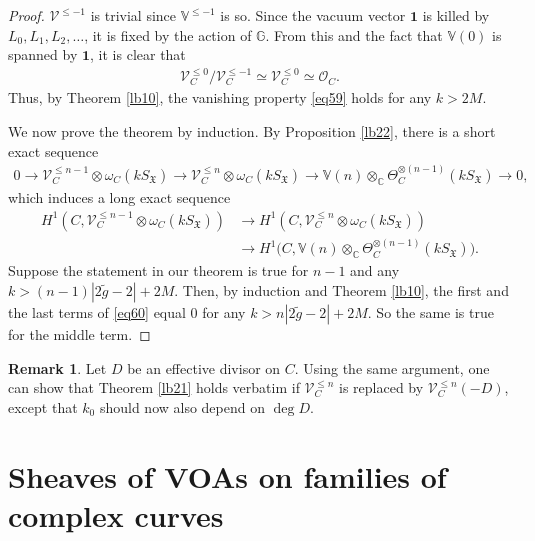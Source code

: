 \documentclass[12pt,a4paper,notitlepage]{report}
\theoremstyle{definition}
\newtheorem{rem}[df]{Remark}
\theoremstyle{plain}
\newcommand{\fk}{\mathfrak}
\newcommand{\wtd}{\widetilde}
\newcommand{\id}{\mathbf{1}}
\newcommand{\scr}{\mathscr}
\newcommand{\SX}{S_{\fk X}}
\newcommand{\Vbb}{\mathbb V}
\newcommand{\Gbb}{\mathbb G}
\newcommand{\Cbb}{\mathbb C}
\numberwithin{equation}{section}
\begin{document}
\begin{proof}
$\scr V^{\leq -1}$ is trivial since $\Vbb^{\leq -1}$ is so. Since the vacuum vector $\id$ is killed by $L_0,L_1,L_2,\dots$, it is fixed by the action of $\Gbb$. From this and the fact that $\Vbb(0)$ is spanned by $\id$, it is clear that
\begin{align}
\scr V_C^{\leq 0}/\scr V_C^{\leq -1}\simeq \scr V_C^{\leq 0}\simeq \scr O_C.
\end{align}
Thus, by Theorem \ref{lb10},  the vanishing property \eqref{eq59} holds for any $k>2M$.

We now prove the theorem by induction. By Proposition \ref{lb22}, there is a  short exact sequence 
\begin{align*}
0\rightarrow \scr V_C^{\leq n-1}\otimes\omega_C(k\SX)\rightarrow \scr V_C^{\leq n}\otimes\omega_C(k\SX) \rightarrow \Vbb(n)\otimes_{\Cbb}\Theta_C^{\otimes(n-1)}(k\SX)\rightarrow 0,
\end{align*}
which induces a long exact sequence
\begin{align}
H^1(C,\scr V_C^{\leq n-1}\otimes\omega_C(k\SX))&\rightarrow H^1(C,\scr V_C^{\leq n}\otimes\omega_C(k\SX))\nonumber\\
&\rightarrow H^1\big(C,\Vbb(n)\otimes_{\Cbb}\Theta_C^{\otimes(n-1)}(k\SX)\big).\label{eq60}
\end{align}
Suppose the statement in our theorem is true for $n-1$ and any $k>(n-1)|2\wtd g-2|+2M$. Then, by  induction and Theorem \ref{lb10},  the first and the last terms of \eqref{eq60} equal $0$ for any $k>n|2\wtd g-2|+2M$. So the same is true for the middle term.
\end{proof}

\begin{rem}\label{lb88}
Let $D$ be an effective divisor on $C$. Using the same argument, one can show that Theorem \ref{lb21} holds verbatim if $\scr V_C^{\leq n}$ is replaced by $\scr V_C^{\leq n}(-D)$, except that $k_0$ should now also depend on $\deg D$.
\end{rem}
	


\section{Sheaves of VOAs on families of complex curves}
\end{document}
